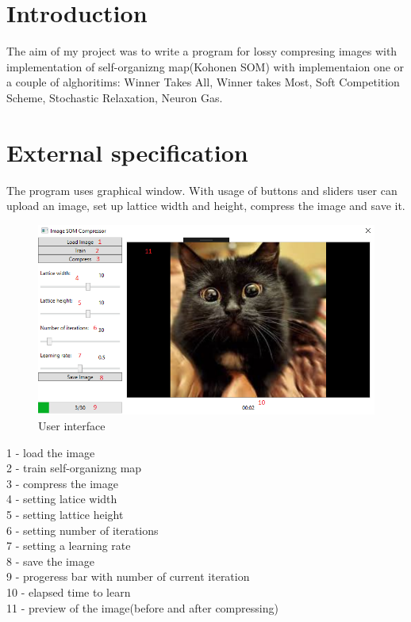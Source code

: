 \documentclass[12pt,a4paper]{article}
\begin{document}
\section{Introduction}
The aim of my project was to write a program for lossy compresing images with implementation of self-organizng map(Kohonen SOM) with implementaion one or a couple of alghoritims: Winner Takes All, Winner takes Most, Soft Competition Scheme, Stochastic Relaxation, Neuron Gas.

\section{External specification}
The program uses graphical window. With usage of buttons and sliders user can upload an image, set up lattice width and height, compress the image and save it.

\begin{figure}[H]
\centering
\includegraphics[width=\textwidth]{images/userInterface}
\caption{User interface}
\end{figure}

1 - load the image\\
2 - train self-organizng map\\
3 - compress the image\\
4 - setting latice width\\
5 - setting lattice height\\
6 - setting number of iterations\\
7 - setting a learning rate\\
8 - save the image\\
9 - progeress bar with number of current iteration\\
10 - elapsed time to learn\\
11 - preview of the image(before and after compressing)\\
\end{document}
